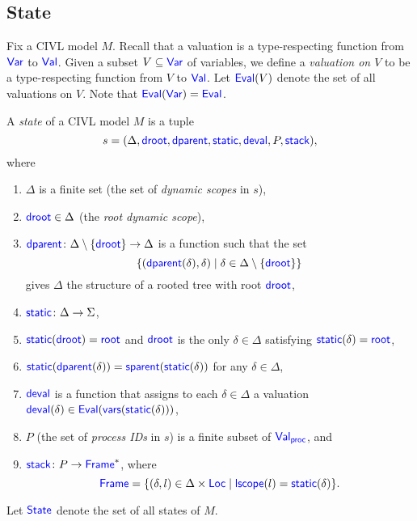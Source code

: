 \documentclass[11pt]{book}
\begin{document}
\subsection{State}
\label{sec:state}

Fix a CIVL model $M$.  Recall that a valuation is a type-respecting
function from $\Var$ to $\Val$.  Given a subset $V\subseteq\Var$ of
variables, we define a \emph{valuation on $V$} to be a type-respecting
function from $V$ to $\Val$.  Let $\Eval(V)$ denote the set of all
valuations on $V$.  Note that $\Eval(\Var)=\Eval$.

\begin{definition}
  \label{def:state}
  A \emph{state} of a CIVL model $M$ is a tuple 
  \[
  s=(\Delta, \droot, \dparent, \static, \deval, P, \stack),
  \]
  where
  \begin{enumerate}
  \item $\Delta$ is a finite set (the set of \emph{dynamic scopes} in
    $s$),
  \item $\droot\in\Delta$ (the \emph{root dynamic scope}),
  \item $\dparent\colon \Delta\setminus\{\droot\}\ra\Delta$
    is a function such that the set 
    \[
    \{(\dparent(\delta),\delta)\mid \delta\in
    \Delta\setminus\{\droot\}\}
    \]
    gives $\Delta$ the structure of a rooted tree with root $\droot$,
    \item $\static\colon\Delta\ra\Sigma$,
  \item $\static(\droot)=\rootscope$ and $\droot$ is the only
    $\delta\in\Delta$ satisfying $\static(\delta)=\rootscope$,
  \item $\static(\dparent(\delta))=\sparent(\static(\delta))$ for any
    $\delta\in\Delta$,
  \item $\deval$ is a function that assigns to each $\delta\in\Delta$
    a valuation $\deval(\delta)\in\Eval(\vars(\static(\delta)))$,
  \item $P$ (the set of \emph{process IDs} in $s$) 
    is a finite subset of $\Val_{\proc}$, and
  \item $\stack\colon P\ra \Frame^*$, where
    \[
    \Frame=\{(\delta,l)\in\Delta\times\Loc\mid\lscope(l)=\static(\delta)\}.
    \]
  \end{enumerate}
  Let $\State$ denote the set of all states of $M$.
\end{definition}

\end{document}
